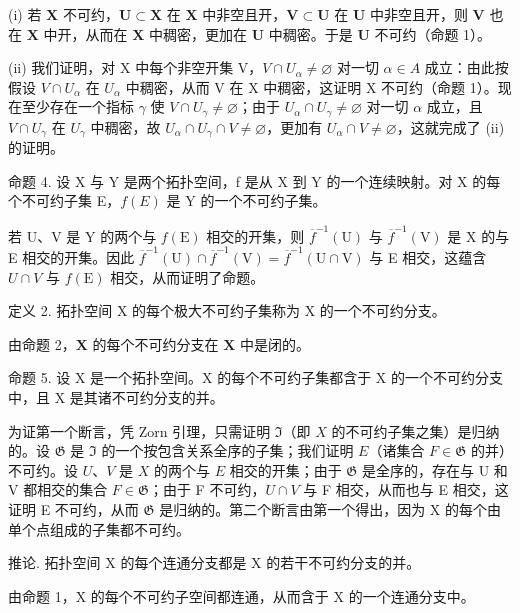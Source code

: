 (i) 若 \(\mathbf{X}\) 不可约，\(\mathbf{U} \subset \mathbf{X}\) 在 \(\mathbf{X}\) 中非空且开，\(\mathbf{V} \subset \mathbf{U}\) 在 \(\mathbf{U}\) 中非空且开，则 \(\mathbf{V}\) 也在 \(\mathbf{X}\) 中开，从而在 \(\mathbf{X}\) 中稠密，更加在 \(\mathbf{U}\) 中稠密。于是 \(\mathbf{U}\) 不可约（命题 1）。

(ii) 我们证明，对 X 中每个非空开集 V，\(V \cap U_{\alpha} \neq \varnothing\) 对一切 \(\alpha \in A\) 成立：由此按假设 \(V \cap U_{\alpha}\) 在 \(U_{\alpha}\) 中稠密，从而 V 在 X 中稠密，这证明 X 不可约（命题 1）。现在至少存在一个指标 \(\gamma\) 使 \(V \cap U_{\gamma} \neq \varnothing\)；由于 \(U_{\alpha} \cap U_{\gamma} \neq \varnothing\) 对一切 \(\alpha\) 成立，且 \(V \cap U_{\gamma}\) 在 \(U_{\gamma}\) 中稠密，故 \(U_{\alpha} \cap U_{\gamma} \cap V \neq \varnothing\)，更加有 \(U_{\alpha} \cap V \neq \varnothing\)，这就完成了 (ii) 的证明。

命题 4. 设 X 与 Y 是两个拓扑空间，f 是从 X 到 Y 的一个连续映射。对 X 的每个不可约子集 E，\(f(E)\) 是 Y 的一个不可约子集。

若 U、V 是 Y 的两个与 \(f(\mathrm{E})\) 相交的开集，则 \(\overline{f}^{-1}(\mathrm{U})\) 与 \(\overline{f}^{-1}(\mathrm{V})\) 是 X 的与 E 相交的开集。因此 \(\overline{f}^{-1}(\mathrm{U}) \cap \overline{f}^{-1}(\mathrm{V}) = \overline{f}^{-1}(\mathrm{U} \cap \mathrm{V})\) 与 E 相交，这蕴含 \(U \cap V\) 与 \(f(\mathrm{E})\) 相交，从而证明了命题。

定义 2. 拓扑空间 X 的每个极大不可约子集称为 X 的一个不可约分支。

由命题 2，\(\mathbf{X}\) 的每个不可约分支在 \(\mathbf{X}\) 中是闭的。

命题 5. 设 X 是一个拓扑空间。X 的每个不可约子集都含于 X 的一个不可约分支中，且 X 是其诸不可约分支的并。

为证第一个断言，凭 Zorn 引理，只需证明 \(\Im\)（即 \(X\) 的不可约子集之集）是归纳的。设 \(\mathfrak{G}\) 是 \(\Im\) 的一个按包含关系全序的子集；我们证明 \(E\)（诸集合 \(F \in \mathfrak{G}\) 的并）不可约。设 \(U\)、\(V\) 是 \(X\) 的两个与 \(E\) 相交的开集；由于 \(\mathfrak{G}\) 是全序的，存在与 U 和 V 都相交的集合 \(F \in \mathfrak{G}\)；由于 F 不可约，\(U \cap V\) 与 F 相交，从而也与 E 相交，这证明 E 不可约，从而 \(\mathfrak{G}\) 是归纳的。第二个断言由第一个得出，因为 X 的每个由单个点组成的子集都不可约。

推论. 拓扑空间 X 的每个连通分支都是 X 的若干不可约分支的并。

由命题 1，X 的每个不可约子空间都连通，从而含于 X 的一个连通分支中。


